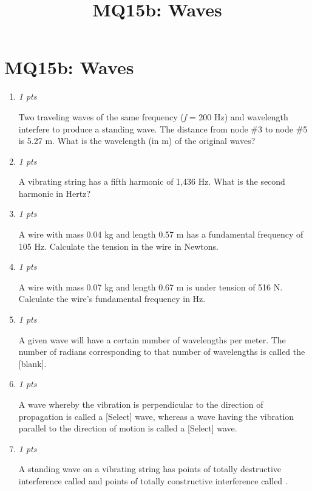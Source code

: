 \documentclass[11pt]{article}
\title{MQ15b: Waves}
\author{}
\date{}
\begin{document}
\maketitle

\section*{MQ15b: Waves}

\begin{enumerate}[leftmargin=*,label=\textbf{Question \arabic*.}]
\item \hfill \textit{1 pts}

Two traveling waves of the same frequency (\emph{f} = 200 Hz) and wavelength interfere to produce a standing wave. The distance from node \#3 to node \#5 is 5.27 m. What is the wavelength (in m) of the original waves?

\item \hfill \textit{1 pts}

A vibrating string has a fifth harmonic of 1,436 Hz. What is the second harmonic in Hertz?

\item \hfill \textit{1 pts}

A wire with mass 0.04 kg and length 0.57 m has a fundamental frequency of 105 Hz. Calculate the tension in the wire in Newtons.

\item \hfill \textit{1 pts}

A wire with mass 0.07 kg and length 0.67 m is under tension of 516 N. Calculate the wire's fundamental frequency in Hz.

\item \hfill \textit{1 pts}

A given wave will have a certain number of wavelengths per meter. The number of radians corresponding to that number of wavelengths is called the [blank].

\item \hfill \textit{1 pts}

A wave whereby the vibration is perpendicular to the direction of propagation is called a [Select]
 wave, whereas a wave having the vibration parallel to the direction of motion is called a [Select]
 wave.

\item \hfill \textit{1 pts}

A standing wave on a vibrating string has points of totally destructive interference called
 and points of totally constructive interference called
.


\end{enumerate}
\end{document}
